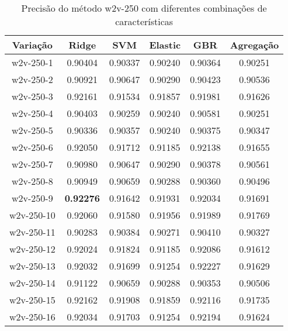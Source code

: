 \begin{table}[H]
\centering
\begin{tabular}{|c| c c  c  c  c| }
\hline
Variação &  Ridge & SVM & Elastic & GBR & Agregação  \\ 
\hline
w2v-250-1 & 0.90404 & 0.90337 & 0.90240 & 0.90364 & 0.90251 \\
\hline
w2v-250-2 & 0.90921 & 0.90647 & 0.90290 & 0.90423 & 0.90536 \\
\hline
w2v-250-3 & 0.92161 & 0.91534 & 0.91857 & 0.91981 & 0.91626 \\
\hline
w2v-250-4 & 0.90403 & 0.90259 & 0.90240 & 0.90581 & 0.90251 \\
\hline
w2v-250-5 & 0.90336 & 0.90357 & 0.90240 & 0.90375 & 0.90347 \\
\hline
w2v-250-6 & 0.92050 & 0.91712 & 0.91185 & 0.92138 & 0.91655 \\
\hline
w2v-250-7 & 0.90980 & 0.90647 & 0.90290 & 0.90378 & 0.90561 \\
\hline
w2v-250-8 & 0.90949 & 0.90659 & 0.90288 & 0.90360 & 0.90496 \\
\hline
w2v-250-9 & \textbf{0.92276} & 0.91642 & 0.91931 & 0.92034 & 0.91691 \\
\hline
w2v-250-10 & 0.92060 & 0.91580 & 0.91956 & 0.91989 & 0.91769 \\
\hline
w2v-250-11 & 0.90283 & 0.90384 & 0.90271 & 0.90410 & 0.90327 \\
\hline
w2v-250-12 & 0.92024 & 0.91824 & 0.91185 & 0.92086 & 0.91612 \\
\hline
w2v-250-13 & 0.92032 & 0.91699 & 0.91254 & 0.92227 & 0.91629 \\
\hline
w2v-250-14 & 0.91122 & 0.90659 & 0.90288 & 0.90353 & 0.90506 \\
\hline
w2v-250-15 & 0.92162 & 0.91908 & 0.91859 & 0.92116 & 0.91735 \\
\hline
w2v-250-16 & 0.92034 & 0.91703 & 0.91254 & 0.92194 & 0.91624 \\
\hline
\end{tabular}
\caption{Precisão do método w2v-250 com diferentes combinações de características}
\label{tab:precisionw2v250}
\end{table}

